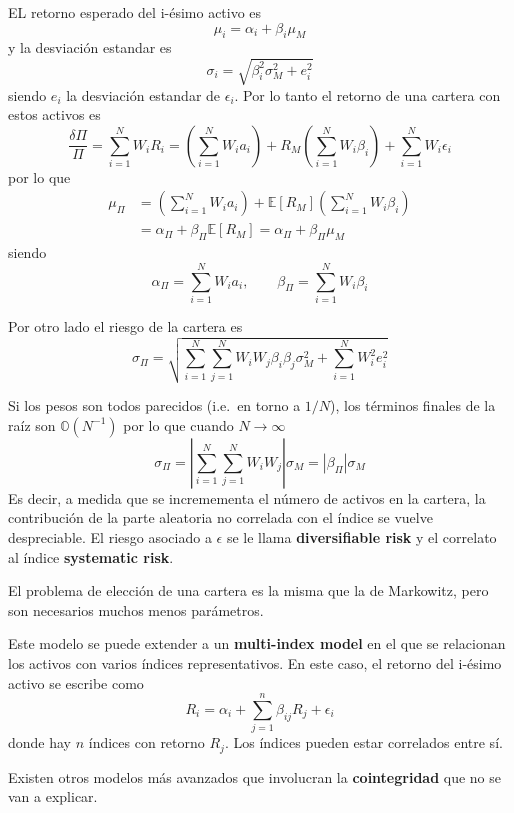 EL retorno esperado del i-ésimo activo es
\[
    \mu_i = \alpha_i + \beta_i \mu_M
\]
y la desviación estandar es
\[
    \sigma_i = \sqrt{\beta_i^2 \sigma_M^2 + e_i^2}
\]
siendo $e_i$ la desviación estandar de $\epsilon_i$. Por lo tanto el retorno de una cartera con estos activos es
\[
    \frac{\delta\Pi}{\Pi} = \sum_{i=1}^N W_i R_i = \left( \sum_{i=1}^N W_i a_i \right) + R_M \left( \sum_{i=1}^N W_i \beta_i \right) + \sum_{i=1}^N W_i \epsilon_i
\]
por lo que
\begin{align*}
    \mu_{\Pi} &= \left( \sum_{i=1}^N W_i a_i \right) + \mathbb{E}\left[R_M\right] \left( \sum_{i=1}^N W_i \beta_i \right) \\
    &= \alpha_{\Pi} + \beta_{\Pi} \mathbb{E}\left[R_M\right] = \boxed{\alpha_{\Pi} + \beta_{\Pi} \mu_M}
\end{align*}
siendo
\[
    \alpha_{\Pi} = \sum_{i=1}^N W_i a_i, \qquad \beta_{\Pi} = \sum_{i=1}^N W_i \beta_i
\]

Por otro lado el riesgo de la cartera es
\[
    \boxed{\sigma_{\Pi} = \sqrt{\sum_{i=1}^N \sum_{j=1}^N W_i W_j \beta_i \beta_j \sigma_M^2+ \sum_{i=1}^N W_i^2 e_i^2}}
\]


Si los pesos son todos parecidos (i.e.\ en torno a $1/N$), los términos finales de la raíz son $\mathbb{O}(N^{-1})$ por lo que cuando $N \to \infty$
\[
    \sigma_{\Pi} = \left| \sum_{i=1}^N \sum_{j=1}^N W_i W_j \right|\sigma_M = \left| \beta_{\Pi} \right|\sigma_M
\]
Es decir, a medida que se incremementa el número de activos en la cartera, la contribución de la parte aleatoria no correlada con el índice se vuelve despreciable. El riesgo asociado a $\epsilon$ se le llama \textbf{diversifiable risk} y el correlato al índice \textbf{systematic risk}.

El problema de elección de una cartera es la misma que la de Markowitz, pero son necesarios muchos menos parámetros.



Este modelo se puede extender a un \textbf{multi-index model} en el que se relacionan los activos con varios índices representativos. En este caso, el retorno del i-ésimo activo se escribe como
\[
    R_i = \alpha_i + \sum_{j=1}^n \beta_{ij} R_j + \epsilon_i
\]
donde hay $n$ índices con retorno $R_j$. Los índices pueden estar correlados entre sí. 



Existen otros modelos más avanzados que involucran la \textbf{cointegridad} que no se van a explicar.







